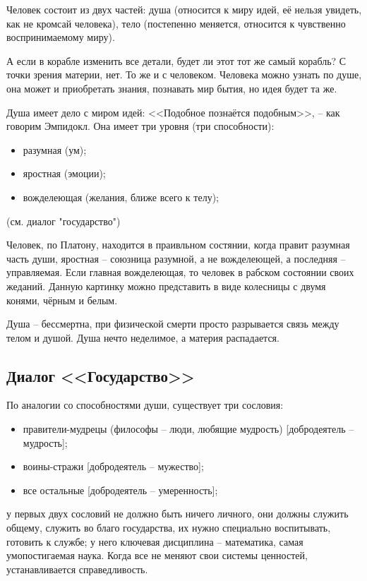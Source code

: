 \documentclass[a4paper, 12pt]{book} %
\begin{document}
Человек состоит из двух частей: душа (относится к миру идей, её нельзя увидеть, как не кромсай человека), тело (постепенно меняется, относится к чувственно воспринимаемому миру).

А если в корабле изменить все детали, будет ли этот тот же самый корабль? С точки зрения материи, нет. То же и с человеком. Человека можно узнать по душе, она может и приобретать знания, познавать мир бытия, но идея будет та же.

Душа имеет дело с миром идей: <<Подобное познаётся подобным>>, -- как говорим Эмпидокл. Она имеет три уровня (три способности):
\begin{itemize}
\item разумная (ум);
\item яростная (эмоции); 
\item вожделеющая (желания, ближе всего  к телу);
\end{itemize}
(см. диалог "государство")

Человек, по Платону, находится в праивльном состянии, когда правит разумная часть души, яростная -- союзница разумной, а не вожделеющей, а последняя -- управляемая.
Если главная вожделеющая, то человек в рабском состоянии своих жеданий.
Данную картинку можно представить в виде колесницы с двумя конями, чёрным и белым.

Душа -- бессмертна, при физической смерти просто разрывается связь между телом и душой. Душа нечто неделимое, а материя распадается.

\subsection{Диалог <<Государство>>}
По аналогии со способностями души, существует три сословия:
\begin{itemize}
\item правители-мудрецы (философы -- люди, любящие мудрость) [добродеятель -- мудрость];
\item воины-стражи [добродеятель -- мужество];
\item все остальные [добродеятель -- умеренность];
\end{itemize} 

у первых двух сословий не должно быть ничего личного, они должны служить общему, служить во благо государства, их нужно специально воспитывать, готовить к службе;
у него ключевая дисциплина -- математика, самая умопостигаемая наука. 
Когда все не меняют свои системы ценностей, устанавливается справедливость.
\end{document}
